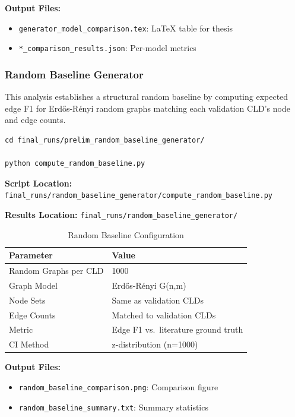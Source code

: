 \textbf{Output Files:}
\begin{itemize}[noitemsep]
    \item \texttt{generator\_model\_comparison.tex}: LaTeX table for thesis
    \item \texttt{*\_comparison\_results.json}: Per-model metrics
\end{itemize}

\subsubsection{Random Baseline Generator}
\label{sec:random_baseline}

This analysis establishes a structural random baseline by computing expected edge F1 for Erd\H{o}s-R\'enyi random graphs matching each validation CLD's node and edge counts.

\begin{verbatim}
cd final_runs/prelim_random_baseline_generator/

python compute_random_baseline.py
\end{verbatim}

\textbf{Script Location:} \texttt{final\_runs/random\_baseline\_generator/compute\_random\_baseline.py}

\textbf{Results Location:} \texttt{final\_runs/random\_baseline\_generator/}

\begin{table}[H]
\centering
\caption{Random Baseline Configuration}
\label{tab:random_baseline_config}
\footnotesize
\begin{tabular}{@{}ll@{}}
\toprule
\textbf{Parameter} & \textbf{Value} \\
\midrule
Random Graphs per CLD & 1000 \\
Graph Model & Erd\H{o}s-R\'enyi G(n,m) \\
Node Sets & Same as validation CLDs \\
Edge Counts & Matched to validation CLDs \\
Metric & Edge F1 vs.\ literature ground truth \\
CI Method & z-distribution (n=1000) \\
\bottomrule
\end{tabular}
\end{table}

\textbf{Output Files:}
\begin{itemize}[noitemsep]
    \item \texttt{random\_baseline\_comparison.png}: Comparison figure
    \item \texttt{random\_baseline\_summary.txt}: Summary statistics
\end{itemize}

